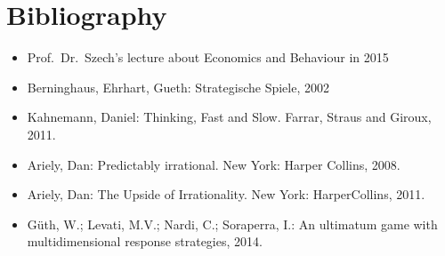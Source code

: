 

\chapter*{Bibliography}
\begin{itemize}
	\item Prof.~Dr.~Szech's lecture about Economics and Behaviour in 2015
	\item Berninghaus, Ehrhart, Gueth: Strategische Spiele, 2002
	\item Kahnemann, Daniel: Thinking, Fast and Slow. Farrar, Straus and Giroux, 2011.
	\item Ariely, Dan: Predictably irrational. New York: Harper Collins, 2008.
	\item Ariely, Dan: The Upside of Irrationality. New York: HarperCollins, 2011. 
	\item Güth, W.; Levati, M.V.; Nardi, C.; Soraperra, I.: An ultimatum game with multidimensional response strategies, 2014.
\end{itemize}